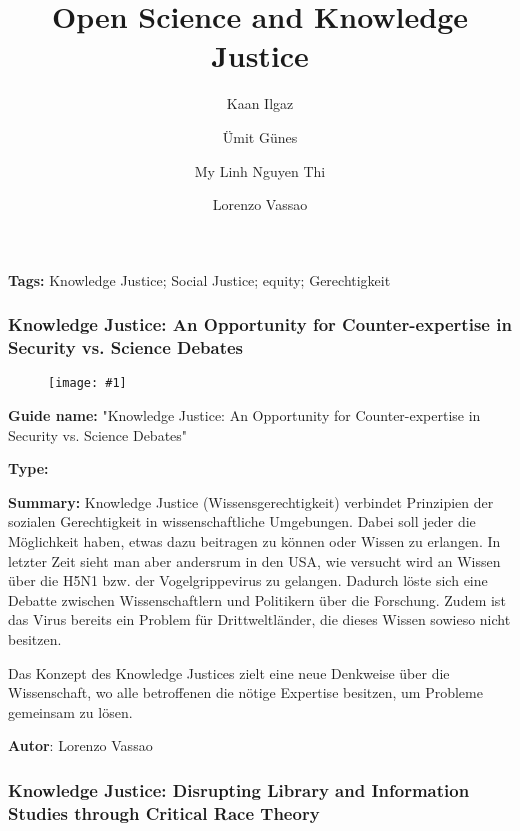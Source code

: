 \documentclass{article}
\newlength{\imgwidth}
\newcommand\scaledgraphics[2]{%
                
\settowidth{\imgwidth}{\texttt{[image: \#1]}}%
                
\setlength{\imgwidth}{\minof{\imgwidth}{#2\textwidth}}%
                
\texttt{[image: \#1]}%
                
}
\begin{document}
\title{Open Science and Knowledge Justice}

\maketitle

\author{Kaan Ilgaz}
\author{Ümit Günes}
\author{My Linh Nguyen Thi}
\author{Lorenzo Vassao}
\affil{}





\textbf{Tags:} Knowledge Justice; Social Justice; equity; Gerechtigkeit


\subsubsection{Knowledge Justice: An Opportunity for Counter-expertise in Security vs. Science Debates}\label{H870315}


\begin{figure}
\scaledgraphics{086e7cc2-fafd-4cc2-8c8f-018ac3a9884d.png}{1}
\label{F24704971}
\end{figure}





\textbf{Guide name:} "Knowledge Justice: An Opportunity for Counter-expertise in Security vs. Science Debates" \autocite{r_egert_knowledge_2017}


\textbf{Type:} 


\textbf{Summary: }Knowledge Justice (Wissensgerechtigkeit) verbindet Prinzipien der sozialen Gerechtigkeit in wissenschaftliche Umgebungen. Dabei soll jeder die Möglichkeit haben, etwas dazu beitragen zu können oder Wissen zu erlangen. In letzter Zeit sieht man aber andersrum in den USA, wie versucht wird an Wissen über die H5N1 bzw. der Vogelgrippevirus zu gelangen. Dadurch löste sich eine Debatte zwischen Wissenschaftlern und Politikern über die Forschung. Zudem ist das Virus bereits ein Problem für Drittweltländer, die dieses Wissen sowieso nicht besitzen.


Das Konzept des Knowledge Justices zielt eine neue Denkweise über die Wissenschaft, wo alle betroffenen die nötige Expertise besitzen, um Probleme gemeinsam zu lösen.


\textbf{Autor}: Lorenzo Vassao


\subsubsection{Knowledge Justice: Disrupting Library and Information Studies through Critical Race Theory}\label{H8244312}
\end{document}
